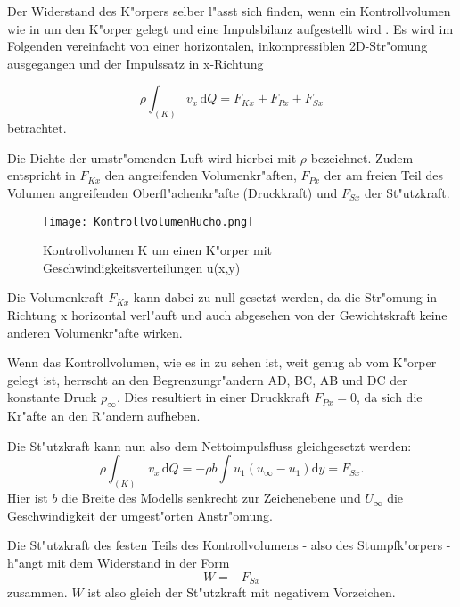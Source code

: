 Der Widerstand des K"orpers selber l"asst sich finden, wenn ein Kontrollvolumen wie in  um den K"orper gelegt und eine Impulsbilanz aufgestellt wird \cite{Hucho.2011}. Es wird im Folgenden vereinfacht von einer horizontalen, inkompressiblen 2D-Str"omung ausgegangen und der Impulssatz in x-Richtung

\begin{equation}
	\label{eq:impulssatz_allg}
	\rho \int_{(K)} v_x \, \mathrm{d}Q = F_{Kx} + F_{Px} + F_{Sx}
\end{equation}
betrachtet.

Die Dichte der umstr"omenden Luft wird hierbei mit $\rho$ bezeichnet.
Zudem entspricht in  $F_{Kx}$ den angreifenden Volumenkr"aften, $F_{Px}$ der am freien Teil des Volumen angreifenden Oberfl"achenkr"afte (Druckkraft) und $F_{Sx}$ der St"utzkraft.

\begin{figure}[h]
	\centering
	\texttt{[image: KontrollvolumenHucho.png]}
	\caption{Kontrollvolumen K um einen K"orper mit Geschwindigkeitsverteilungen u(x,y)~\cite{Hucho.2011}}
	\label{fig:HuchoKV}
\end{figure}

Die Volumenkraft $F_{Kx}$ kann dabei zu null gesetzt werden, da die Str"omung in Richtung x horizontal verl"auft und auch abgesehen von der Gewichtskraft keine anderen Volumenkr"afte wirken.

Wenn das Kontrollvolumen, wie es in  zu sehen ist, weit genug ab vom K"orper gelegt ist, herrscht an den Begrenzungr"andern AD, BC, AB und DC der konstante Druck $p_{\infty}$.
Dies resultiert in einer Druckkraft $F_{Px} = 0$, da sich die Kr"afte an den R"andern aufheben.

Die St"utzkraft kann nun also dem Nettoimpulsfluss gleichgesetzt werden:
\begin{equation}
	\label{eq:nettoimpulsfluss}
	\rho \int_{(K)} \, v_x \, \mathrm{d}Q	= -\rho b \int u_1(u_{\infty} - u_1) \mathrm{d}y = F_{Sx}.	
\end{equation}
Hier ist $b$ die Breite des Modells senkrecht zur Zeichenebene und $U_{\infty}$ die Geschwindigkeit der umgest"orten Anstr"omung.

Die St"utzkraft des festen Teils des Kontrollvolumens - also des Stumpfk"orpers - h"angt mit dem Widerstand in der Form
\begin{equation}
	\label{eq:W=-F_Sx}
	W = - F_{Sx}
\end{equation}
zusammen. 
$W$ ist also gleich der St"utzkraft mit negativem Vorzeichen.

